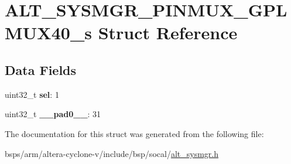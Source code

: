 \hypertarget{structALT__SYSMGR__PINMUX__GPLMUX40__s}{}\section{A\+L\+T\+\_\+\+S\+Y\+S\+M\+G\+R\+\_\+\+P\+I\+N\+M\+U\+X\+\_\+\+G\+P\+L\+M\+U\+X40\+\_\+s Struct Reference}
\label{structALT__SYSMGR__PINMUX__GPLMUX40__s}
\subsection*{Data Fields}
\begin{DoxyCompactItemize}
\item 
\mbox{\label{structALT__SYSMGR__PINMUX__GPLMUX40__s_a1153a3d0b2c133b545780f76bc7c2b64}} 
uint32\+\_\+t {\bfseries sel}\+: 1
\item 
\mbox{\label{structALT__SYSMGR__PINMUX__GPLMUX40__s_adede4562742295885e3115eb2b660ca5}} 
uint32\+\_\+t {\bfseries \+\_\+\+\_\+pad0\+\_\+\+\_\+}\+: 31
\end{DoxyCompactItemize}


The documentation for this struct was generated from the following file\+:\begin{DoxyCompactItemize}
\item 
bsps/arm/altera-\/cyclone-\/v/include/bsp/socal/\mbox{\hyperlink{alt__sysmgr_8h}{alt\+\_\+sysmgr.\+h}}\end{DoxyCompactItemize}
